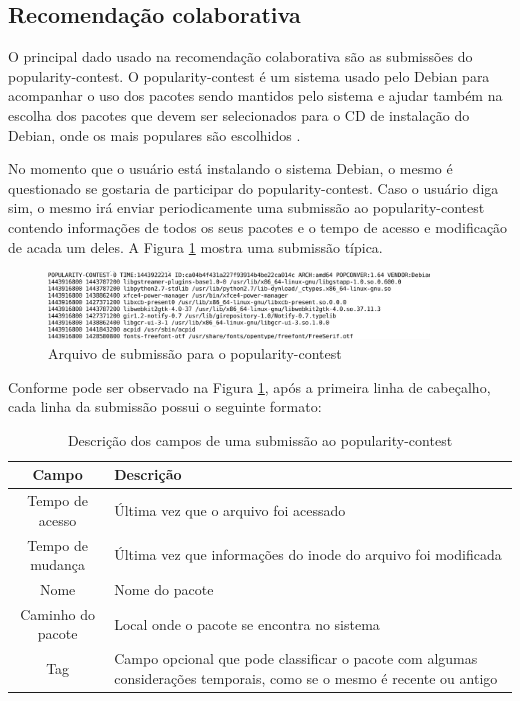 \subsection{Recomendação colaborativa}

O principal dado usado na recomendação colaborativa são as submissões do
popularity-contest. O popularity-contest é um sistema usado pelo Debian para
acompanhar o uso dos pacotes sendo mantidos pelo sistema e ajudar também na
escolha dos pacotes que devem ser selecionados para o CD de instalação do
Debian, onde os mais populares são escolhidos \cite{araujo2011apprecommender}.

No momento que o usuário está instalando o sistema Debian, o mesmo é
questionado se gostaria de participar do
popularity-contest. Caso o usuário diga sim, o mesmo irá enviar periodicamente
uma submissão ao popularity-contest contendo informações de todos os seus
pacotes e o tempo de acesso e modificação de acada um deles. A Figura
\ref{fig:submissao_popcon} mostra uma submissão típica.

\begin{figure}[h]
  \centering
  \includegraphics[width=0.9\textwidth]{figuras/submissao_popcon.eps}
  \caption{Arquivo de submissão para o popularity-contest}
  \label{fig:submissao_popcon}
\end{figure}

Conforme pode ser observado na Figura \ref{fig:submissao_popcon}, após a
primeira linha de cabeçalho, cada linha da submissão possui o seguinte formato:

\begin{table}[h!]
\centering
\newcommand\T{\rule{0pt}{2.8ex}}
\newcommand\B{\rule[-1.8ex]{0pt}{0pt}}
\begin{tabularx}{15cm}{| c | X |}
\hline
\rowcolor[HTML]{EFEFEF}
{\textbf{Campo}} & \textbf{Descrição} \\ \hline
{Tempo de acesso}  & Última vez que o arquivo foi acessado \\ \hline
{Tempo de mudança}   & Última vez que informações do inode do arquivo foi
                       modificada\\ \hline
{Nome}   & Nome do pacote                  \\ \hline
{Caminho do pacote}   & Local onde o pacote se encontra no sistema \\ \hline
{Tag}   & Campo opcional que pode classificar o pacote com algumas considerações
temporais, como se o mesmo é recente ou antigo\\ \hline
\end{tabularx}
\caption{Descrição dos campos de uma submissão ao popularity-contest}
\label{tab:submissao_popcon}
\end{table}

